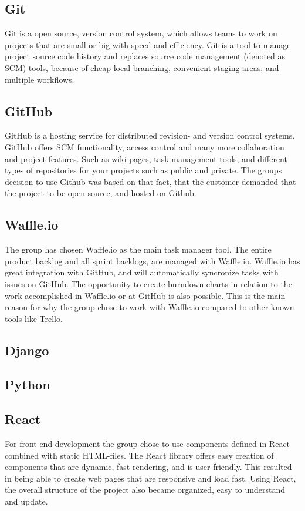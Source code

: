 \subsection{Git}
Git \cite{Git} is a open source, version control system, which allows teams to work on projects that are small or big with speed and efficiency. Git is a tool to manage project source code history and replaces source code management (denoted as SCM)  tools, because of cheap local branching, convenient staging areas, and multiple workflows.

\subsection{GitHub}
\label{GitHub}
GitHub\cite{GitHub} is a hosting service for distributed revision- and version control systems. GitHub offers SCM functionality, access control and many more collaboration and project features. Such as wiki-pages, task management tools, and different types of repositories for your projects such as public and private. The groups decision to use Github was based on that fact, that the customer demanded that the project to be open source, and hosted on Github. 

\subsection{Waffle.io}
\label{Waffle.io}
The group has chosen Waffle.io \cite{Waffle} as the main task manager tool. The entire product backlog and all sprint backlogs, are managed with Waffle.io. Waffle.io has great integration with GitHub, and will automatically syncronize tasks with issues on GitHub. The opportunity to create burndown-charts in relation to the work accomplished in Waffle.io or at GitHub is also possible. This is the main reason for why the group chose to work with Waffle.io compared to other known tools like Trello. 

\subsection{Django}
\subsection{Python}
\subsection{React}
For front-end development the group chose to use components defined in React \cite{React} combined with static HTML-files. The React library offers easy creation of components that are dynamic, fast rendering, and is user friendly. This resulted in being able to create web pages that are responsive and load fast. Using React, the overall structure of the project also became organized, easy to understand and update.

